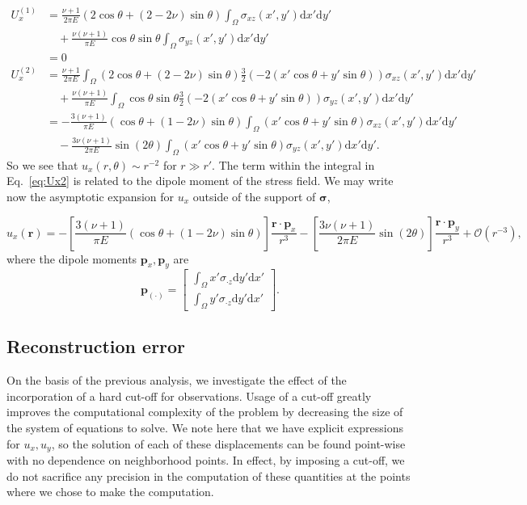 \documentclass{article}
\newcommand{\dd}{\mathrm{d}}
\newcommand{\br}{\mathbf{r}}
\newcommand{\bp}{\mathbf{p}}
\begin{document}
\begin{align}
U_x^{(1)} &= \frac{\nu+1}{2\pi E} (2\cos\theta + (2-2\nu)\sin\theta) \int_\Omega \sigma_{xz}(x',y')\dd x' \dd y' \nonumber\\
&\quad+\frac{\nu(\nu+1)}{\pi E}\cos\theta\sin\theta \int_\Omega \sigma_{yz}(x',y')\dd x' \dd y' \nonumber \\
&=0 \\
U_x^{(2)} &=  \frac{\nu+1}{2\pi E}\int_\Omega (2\cos\theta + (2-2\nu)\sin\theta)\frac{3}{2}(-2(x'\cos\theta+y'\sin\theta)) \sigma_{xz}(x',y') \dd x' \dd y' \nonumber \\
&\quad+\frac{\nu(\nu+1)}{\pi E} \int_\Omega \cos\theta\sin\theta\frac{3}{2}(-2(x'\cos\theta+y'\sin\theta)) \sigma_{yz}(x',y') \dd x' \dd y' \nonumber \\
&=-\frac{3(\nu+1)}{\pi E}(\cos\theta + (1-2\nu)\sin\theta) \int_{\Omega} (x'\cos\theta + y'\sin\theta ) \sigma_{xz}(x',y') \dd x' \dd y' \nonumber \\ 
&\quad - \frac{3\nu(\nu+1)}{2\pi E}\sin(2\theta) \int_\Omega(x'\cos\theta + y'\sin\theta ) \sigma_{yz}(x',y') \dd x' \dd y' .\label{eq:Ux2}
\end{align}
So we see that $u_x(r,\theta)\sim r^{-2}$ for $r\gg r'$. The term within the integral in Eq.~\ref{eq:Ux2} is related to the dipole moment of the stress field. We may write now the asymptotic expansion for $u_x$ outside of the support of $\boldsymbol\sigma$,

\begin{equation}
u_x(\br)  = -\left[ \frac{3(\nu+1)}{\pi E}(\cos\theta + (1-2\nu)\sin\theta) \right] \frac{\br\cdot \bp_x}{r^3} -\left[ \frac{3\nu(\nu+1)}{2\pi E}\sin(2\theta)  \right] \frac{\br\cdot \bp_y}{r^3} + \mathcal{O}(r^{-3}),
\end{equation}
%
where the dipole moments $\bp_x,\bp_y$ are
%
\begin{equation}
\bp_{(\cdot)}  = \left[ \begin{matrix} \displaystyle\int_{\Omega} x' \sigma_{\cdot z} \dd y' \dd x' \\ \displaystyle\int_{\Omega} y' \sigma_{\cdot z} \dd y' \dd x'  \end{matrix} \right].
\end{equation}



\subsection{Reconstruction error}

On the basis of the previous analysis, we investigate the effect of the incorporation of a hard cut-off for observations. Usage of a cut-off greatly improves the computational complexity of the problem by decreasing the size of the system of equations to solve. We note here that we have explicit expressions for $u_x,u_y$, so the solution of each of these displacements can be found point-wise with no dependence on neighborhood points. In effect, by imposing a cut-off, we do not sacrifice any precision in the computation of these quantities at the points where we chose to make the computation.
\end{document}

